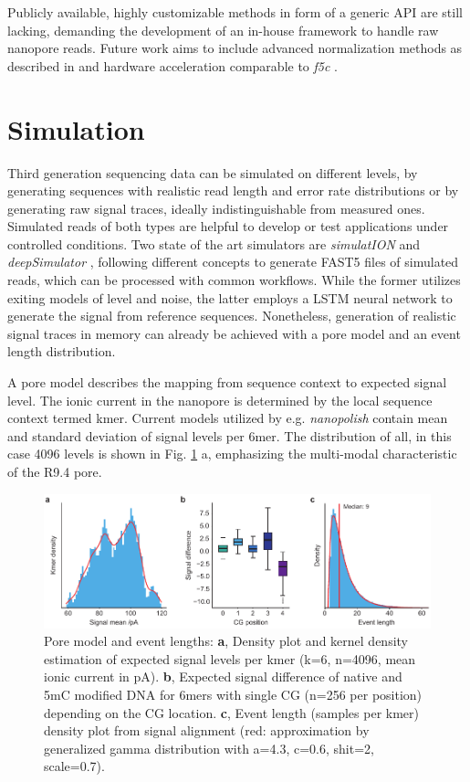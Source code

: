 Publicly available, highly customizable methods in form of a generic API are still lacking, demanding the development of an in-house framework to handle raw nanopore reads. Future work aims to include advanced normalization methods as described in \cite{Boza2017} and hardware acceleration comparable to \textit{f5c} \cite{Gamaarachchi2020}.




\section{Simulation}
\label{sec:signal:simulation}

Third generation sequencing data can be simulated on different levels, by generating sequences with realistic read length and error rate distributions or by generating raw signal traces, ideally indistinguishable from measured ones. Simulated reads of both types are helpful to develop or test applications under controlled conditions. Two state of the art simulators are \textit{simulatION} \cite{Rohrandt2018} and \textit{deepSimulator} \cite{Li2020}, following different concepts to generate FAST5 files of simulated reads, which can be processed with common workflows. While the former utilizes exiting models of level and noise, the latter employs a LSTM neural network to generate the signal from reference sequences. Nonetheless, generation of realistic signal traces in memory can already be achieved with a pore model and an event length distribution.

A pore model describes the mapping from sequence context to expected signal level. The ionic current in the nanopore is determined by the local sequence context termed kmer. Current models utilized by e.g. \textit{nanopolish} contain mean and standard deviation of signal levels per 6mer. The distribution of all, in this case 4096 levels is shown in Fig. \ref{fig:signal:pm} a, emphasizing the multi-modal characteristic of the R9.4 pore.

\begin{figure}[h]
	\centering
	\includegraphics[width=1.0\textwidth]{figures/signal/pm.pdf}
	\captionsetup{format=plain}
	\caption[Pore model and event length]{Pore model and event lengths: \textbf{a}, Density plot and kernel density estimation of expected signal levels per kmer (k=6, n=4096, mean ionic current in pA). \textbf{b}, Expected signal difference of native and 5mC modified DNA for 6mers with single CG (n=256 per position) depending on the CG location. \textbf{c}, Event length (samples per kmer) density plot from signal alignment (red: approximation by generalized gamma distribution with a=4.3, c=0.6, shit=2, scale=0.7).}
	\label{fig:signal:pm}
\end{figure}


